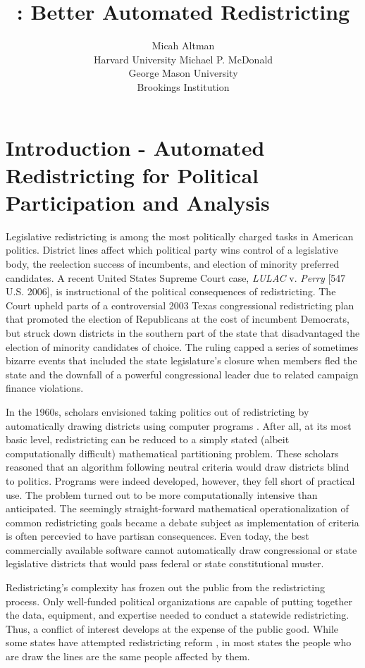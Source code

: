 \documentclass[article]{JSSstyle/jss}
\author{Micah Altman\\Harvard University
\And Michael P. McDonald \\George Mason University\\Brookings Institution
}
\title{\pkg{BARD}: Better Automated Redistricting}
\begin{document}
\section{Introduction - Automated Redistricting for Political Participation and Analysis}

Legislative redistricting is among the most politically charged 
tasks in American politics.  District lines affect which political 
party wins control of a legislative body, the reelection success of 
incumbents, and election of minority preferred candidates.  A recent United States 
Supreme Court case, \emph{LULAC} v. \emph{Perry} [547 U.S. 2006], is instructional of the political consequences of redistricting.  The Court 
upheld parts of a controversial 2003 Texas congressional redistricting 
plan that promoted the election of Republicans at the cost of 
incumbent Democrats, but struck down districts in the southern part 
of the state that disadvantaged the election of minority candidates 
of choice.  The ruling capped a series of sometimes bizarre events 
that included the state legislature's closure when members fled the 
state and the downfall of a powerful congressional leader due to 
related campaign finance violations.

In the 1960s, scholars envisioned taking politics out of 
redistricting by automatically drawing districts using computer programs \citep[][]{Vickrey61, WeaverHess63}.  After 
all, at its most basic level, redistricting can be reduced to a simply stated
(albeit computationally difficult) mathematical partitioning problem.  These scholars 
reasoned that an algorithm following neutral criteria would draw 
districts blind to politics.  Programs were indeed developed, 
however, they fell short of practical use.  The problem turned out 
to be more computationally intensive than anticipated.  The seemingly straight-forward mathematical operationalization 
of common redistricting goals became a debate subject as implementation of criteria is often percevied to have partisan consequences.  
Even today, the best commercially available software cannot 
automatically draw congressional or state legislative districts that 
would pass federal or state constitutional muster. 

Redistricting's complexity has frozen out the public from the 
redistricting process.  Only well-funded political organizations are capable 
of putting together the data, equipment, and expertise needed to 
conduct a statewide redistricting.  Thus, a conflict of interest 
develops at the expense of the public good.  While some states have 
attempted redistricting reform \citep[][]{McDonald06}, in most 
states the people who are draw the lines are the same people affected by them.
\end{document}
